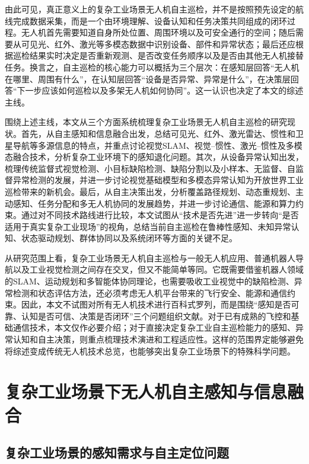 由此可见，真正意义上的复杂工业场景无人机自主巡检，并不是按照预先设定的航线完成数据采集，而是一个由环境理解、设备认知和任务决策共同组成的闭环过程。无人机首先需要知道自身所处位置、周围环境以及可安全通行的空间；随后需要从可见光、红外、激光等多模态数据中识别设备、部件和异常状态；最后还应根据巡检结果实时决定是否重新观测、是否改变任务顺序以及是否由其他无人机接替任务。换言之，自主巡检的核心能力可以概括为三个层次：在感知层回答“无人机在哪里、周围有什么”，在认知层回答“设备是否异常、异常是什么”，在决策层回答“下一步应该如何巡检以及多架无人机如何协同”。这一认识也决定了本文的综述主线。

围绕上述主线，本文从三个方面系统梳理复杂工业场景无人机自主巡检的研究现状。首先，从自主感知和信息融合出发，总结可见光、红外、激光雷达、惯性和卫星导航等多源信息的特点，并重点讨论视觉SLAM、视觉--惯性、激光--惯性及多模态融合技术，分析复杂工业环境下的感知退化问题。其次，从设备异常认知出发，梳理传统监督式视觉检测、小目标缺陷检测、缺陷分割以及小样本、无监督、自监督异常检测的发展，并进一步讨论视觉基础模型和多模态异常认知为开放世界工业巡检带来的新机会。最后，从自主决策出发，分析覆盖路径规划、动态重规划、主动感知、任务分配和多无人机协同的发展趋势，并进一步讨论通信、能源和算力约束。通过对不同技术路线进行比较，本文试图从“技术是否先进”进一步转向“是否适用于真实复杂工业现场”的视角，总结当前自主巡检在鲁棒性感知、未知异常认知、状态驱动规划、群体协同以及系统闭环等方面的关键不足。



从研究范围上看，复杂工业场景无人机自主巡检与一般无人机应用、普通机器人导航以及工业视觉检测之间存在交叉，但又不能简单等同。它既需要借鉴机器人领域的SLAM、运动规划和多智能体协同理论，也需要吸收工业视觉中的缺陷检测、异常检测和状态评估方法，还必须考虑无人机平台带来的飞行安全、能源和通信约束。因此，本文不试图对所有无人机技术进行百科式罗列，而是围绕“感知是否可靠、认知是否可信、决策是否闭环”三个问题组织文献。对于已有成熟的飞控和基础通信技术，本文仅作必要介绍；对于直接决定复杂工业自主巡检能力的感知、异常认知和自主决策，则重点梳理技术演进和工程适应性。这样的范围界定能够避免将综述变成传统无人机技术总览，也能够突出复杂工业场景下的特殊科学问题。

\section{复杂工业场景下无人机自主感知与信息融合}

\subsection{复杂工业场景的感知需求与自主定位问题}


